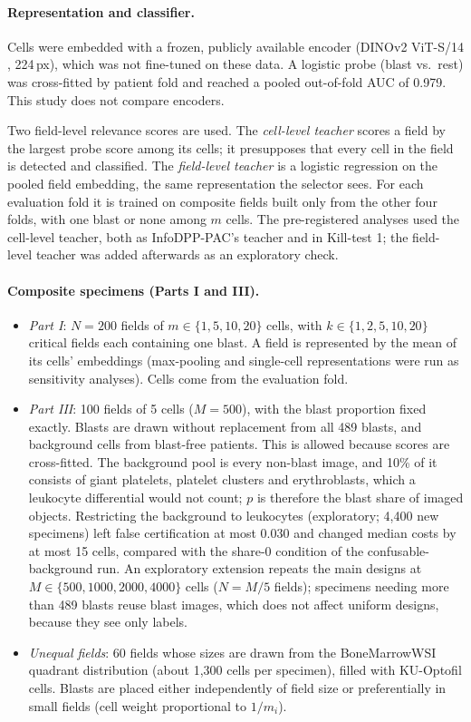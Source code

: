 \documentclass[11pt]{article}
\theoremstyle{remark}
\theoremstyle{definition}
\begin{document}
\paragraph{Representation and classifier.} Cells were embedded with a frozen, publicly available encoder (DINOv2 ViT-S/14 \cite{oquab2023dinov2}, 224\,px), which was not fine-tuned on these data. A logistic probe (blast vs.\ rest) was cross-fitted by patient fold and reached a pooled out-of-fold AUC of 0.979. This study does not compare encoders.

Two field-level relevance scores are used. The \emph{cell-level teacher} scores a field by the largest probe score among its cells; it presupposes that every cell in the field is detected and classified. The \emph{field-level teacher} is a logistic regression on the pooled field embedding, the same representation the selector sees. For each evaluation fold it is trained on composite fields built only from the other four folds, with one blast or none among $m$ cells. The pre-registered analyses used the cell-level teacher, both as InfoDPP-PAC's teacher and in Kill-test 1; the field-level teacher was added afterwards as an exploratory check.

\paragraph{Composite specimens (Parts I and III).}
\begin{itemize}
\item \emph{Part I}: $N=200$ fields of $m\in\{1,5,10,20\}$ cells, with $k\in\{1,2,5,10,20\}$ critical fields each containing one blast. A field is represented by the mean of its cells' embeddings (max-pooling and single-cell representations were run as sensitivity analyses). Cells come from the evaluation fold.
\item \emph{Part III}: 100 fields of 5 cells ($M=500$), with the blast proportion fixed exactly. Blasts are drawn without replacement from all 489 blasts, and background cells from blast-free patients. This is allowed because scores are cross-fitted. The background pool is every non-blast image, and 10\% of it consists of giant platelets, platelet clusters and erythroblasts, which a leukocyte differential would not count; $p$ is therefore the blast share of imaged objects. Restricting the background to leukocytes (exploratory; 4,400 new specimens) left false certification at most 0.030 and changed median costs by at most 15 cells, compared with the share-0 condition of the confusable-background run. An exploratory extension repeats the main designs at $M\in\{500,1000,2000,4000\}$ cells ($N=M/5$ fields); specimens needing more than 489 blasts reuse blast images, which does not affect uniform designs, because they see only labels.
\item \emph{Unequal fields}: 60 fields whose sizes are drawn from the BoneMarrowWSI quadrant distribution (about 1,300 cells per specimen), filled with KU-Optofil cells. Blasts are placed either independently of field size or preferentially in small fields (cell weight proportional to $1/m_i$).
\end{itemize}
\end{document}
